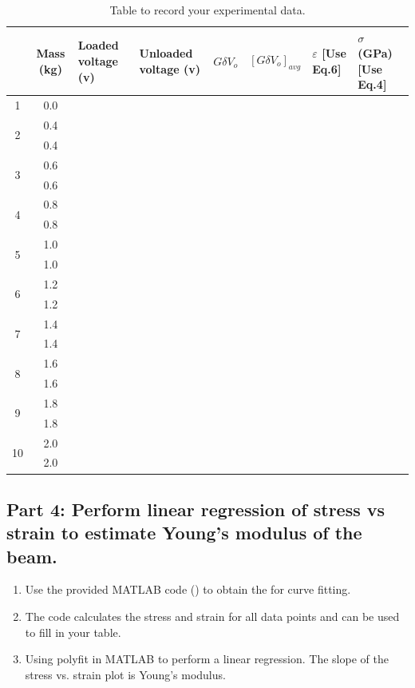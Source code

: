 \documentclass{article} %
\begin{document}
\begin{table}[H]
    \Large
    \caption{Table to record your experimental data.}
    \centering
    \begin{tabular}{c|c|p{2cm}|p{2cm}|c|c| p{1.5cm}|p{2cm}|}
    \toprule \toprule
    &Mass (kg) & Loaded voltage (v) & Unloaded voltage (v) & $G \delta V_o$ & $[G \delta V_o]_{avg}$ & $\varepsilon$ \newline\small{[Use Eq.6]}& $\sigma$ (GPa)  \small{[Use Eq.4]}\\ \hline
    1&0.0 & & & & &  & \\ \hline
    \multirow{2}{*}{2}& 0.4 & & & & & & \\ \cline{4-5}
                              & 0.4 & & & & & & \\ \hline
    \multirow{2}{*}{3}&0.6 & & & & & & \\ \cline{4-5}
                              &0.6 & & & & & & \\ \hline
    \multirow{2}{*}{4}&0.8 & & & & & & \\ \cline{4-5}
                              &0.8 & & & & & &\\ \hline
    \multirow{2}{*}{5}&1.0 & & & & & &\\ \cline{4-5}
                              &1.0 & & & & & &\\ \hline
    \multirow{2}{*}{6}&1.2 & & & & & &\\ \cline{4-5}
                              &1.2 & & & & & & \\ \hline
    \multirow{2}{*}{7}&1.4 & & & & & & \\ \cline{4-5}
                              &1.4 & & & & & &\\ \hline
    \multirow{2}{*}{8}&1.6 & & & & & &\\ \cline{4-5}
                               &1.6 & & & & & &\\ \hline
    \multirow{2}{*}{9}&1.8 & & & & & &\\ \cline{4-5}
                              &1.8 & & & & & &\\ \hline
    \multirow{2}{*}{10}&2.0 & & & & & & \\ \cline{4-5}
                                &2.0 & & & & & &\\ \bottomrule \bottomrule
    \end{tabular}
    \label{tab:data}
\end{table}

\subsection{Part 4: Perform linear regression of stress vs strain to estimate Young’s modulus of the beam.}
\begin{enumerate}
    \item Use the provided MATLAB code () to obtain the for curve fitting.
    \item The code calculates the stress and strain for all data points and can be used to fill in your table. 
    \item Using polyfit in MATLAB to perform a linear regression. The slope of the stress vs. strain plot is Young’s modulus.
\end{enumerate}
\end{document}
